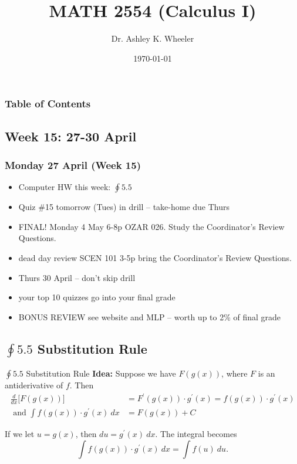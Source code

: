 \documentclass[14pt]{beamer}
\title[Cal I S2015]{MATH 2554 (Calculus I)}
\subtitle{}
\author[Wheeler]{Dr. Ashley K. Wheeler}
\institute{University of Arkansas}
\date{\today}
\newcommand{\dint}{\displaystyle\int}
\begin{document}
\maketitle

\begin{frame}
\frametitle{Table of Contents}
\tableofcontents
\end{frame}


\begin{frame}
\section[Week 15]{Week 15: 27-30 April}
\frametitle{Monday 27 April (Week 15)}
\footnotesize
\begin{itemize}
\item Computer HW this week: $\oint 5.5$
\item Quiz \#15 tomorrow (Tues) in drill -- take-home due Thurs
\item FINAL! Monday 4 May 6-8p OZAR 026.  Study the Coordinator's Review Questions.
\item dead day review SCEN 101 3-5p bring the Coordinator's Review Questions.
\item Thurs 30 April -- don't skip drill
\item your top 10 quizzes go into your final grade
\item BONUS REVIEW see website and MLP -- worth up to 2\% of final grade
\end{itemize}
\end{frame}

\subsection[$\oint 5.5$ Substitution Rule]{$\oint 5.5$ Substitution Rule}

\begin{frame}{$\oint 5.5$ Substitution Rule}
\footnotesize
{\bf Idea:}  Suppose we have $F(g(x))$, where $F$ is an antiderivative of $f$.  Then
\begin{align*}
\frac{d}{dx} \bigg[F(g(x)) \bigg] &= F^{\prime}(g(x)) \cdot g^{\prime}(x) = f(g(x)) \cdot g^{\prime}(x) \\
\text{ and }\dint f(g(x)) \cdot g^{\prime}(x)\ dx &= F(g(x))+C
\end{align*}

\vspace{1pc}
If we let $u=g(x)$, then $du=g^{\prime}(x)\ dx$.  The integral becomes
\[\dint f(g(x)) \cdot g^{\prime}(x)\ dx = \dint f(u)\ du.\]
\end{frame}
\end{document}
